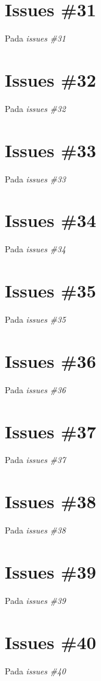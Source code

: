 \section{Issues \#31}
Pada \textit{issues \#31}

\section{Issues \#32}
Pada \textit{issues \#32}

\section{Issues \#33}
Pada \textit{issues \#33}

\section{Issues \#34}
Pada \textit{issues \#34}

\section{Issues \#35}
Pada \textit{issues \#35}

\section{Issues \#36}
Pada \textit{issues \#36}

\section{Issues \#37}
Pada \textit{issues \#37}

\section{Issues \#38}
Pada \textit{issues \#38}

\section{Issues \#39}
Pada \textit{issues \#39}

\section{Issues \#40}
Pada \textit{issues \#40}